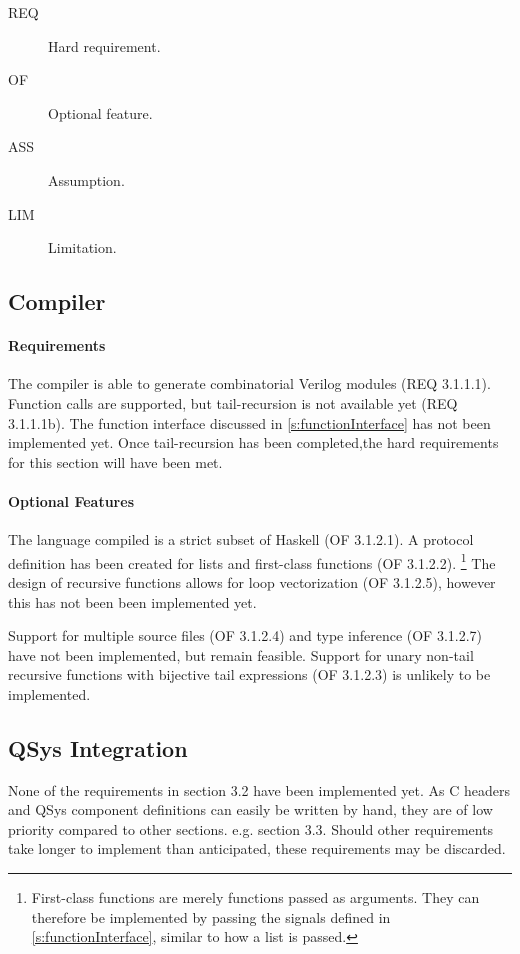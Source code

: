 \documentclass[english,onecolumn]{article}
\begin{document}
\begin{description}
        \item[REQ] Hard requirement.
        \item[OF] Optional feature.
        \item[ASS] Assumption.
        \item[LIM] Limitation.
\end{description}

\subsection{Compiler}
\paragraph{Requirements}
The compiler is able to generate combinatorial Verilog modules (REQ 3.1.1.1).
Function calls are supported, but tail-recursion is not available yet (REQ 3.1.1.1b).
The function interface discussed in \ref{s:functionInterface} has not been implemented yet.
Once tail-recursion has been completed,\footnotemark the hard requirements for this section will have been met.

\paragraph{Optional Features}
The language compiled is a strict subset of Haskell (OF 3.1.2.1). A protocol definition has been created for lists and first-class functions (OF 3.1.2.2).%
\footnote{First-class functions are merely functions passed as arguments. They can therefore be implemented by passing the signals defined in \ref{s:functionInterface}, similar to how a list is passed.}
The design of recursive functions allows for loop vectorization (OF 3.1.2.5), however this has not been been implemented yet.

Support for multiple source files (OF 3.1.2.4) and type inference (OF 3.1.2.7) have not been implemented, but remain feasible. Support for unary non-tail recursive functions with bijective tail expressions (OF 3.1.2.3) is unlikely to be implemented.

\subsection{QSys Integration}
None of the requirements in section 3.2 have been implemented yet.
As C headers and QSys component definitions can easily be written by hand, they are of low priority compared to other sections. e.g. section 3.3. Should other requirements take longer to implement than anticipated, these requirements may be discarded.
\end{document}
